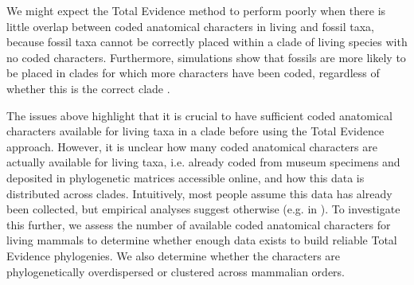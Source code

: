 \documentclass[12pt,letterpaper]{article}
\begin{document}
We might expect the Total Evidence method to perform poorly when there is little overlap between coded anatomical characters in living and fossil taxa, because fossil taxa cannot be correctly placed within a clade of living species with no coded characters.
Furthermore, simulations show that fossils are more likely to be placed in clades for which more characters have been coded, regardless of whether this is the correct clade \cite{GuillermeCooper}. %

The issues above highlight that it is crucial to have sufficient coded anatomical characters available for living taxa in a clade before using the Total Evidence approach.
However, it is unclear how many coded anatomical characters are actually available for living taxa, i.e. already coded from museum specimens and deposited in phylogenetic matrices accessible online, and how this data is distributed across clades.
Intuitively, most people assume this data has already been collected, but empirical analyses suggest otherwise (e.g. in \cite{ronquista2012,slaterphylogenetic2013,beckancient2014}).
To investigate this further, we assess the number of available coded anatomical characters for living mammals to determine whether enough data exists to build reliable Total Evidence phylogenies.
We also determine whether the characters are phylogenetically overdispersed or clustered across mammalian orders.
%
%
\end{document}
